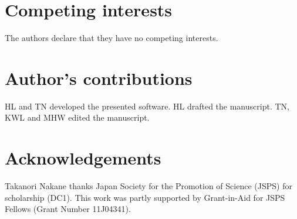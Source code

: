\documentclass[twocolumn]{bmcart}%
\begin{document}
\begin{backmatter}

\section*{Competing interests}
The authors declare that they have no competing interests.

\section*{Author's contributions}
HL and TN developed the presented software. HL drafted the manuscript. TN, KWL and MHW edited the manuscript.%

\section*{Acknowledgements}
Takanori Nakane thanks Japan Society for the Promotion of Science (JSPS) for scholarship (DC1). This work was partly supported by Grant-in-Aid for JSPS Fellows (Grant Number 11J04341).






\end{backmatter}
\end{document}
